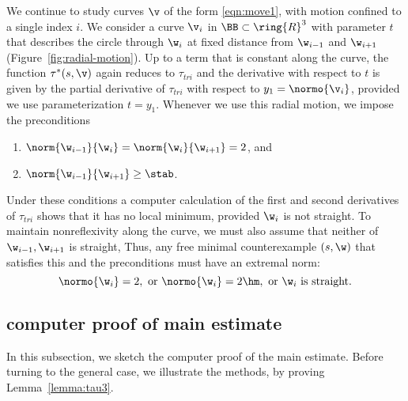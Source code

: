 %
\begin{remark}\label{rem:radial}
  We continue to study curves $\v$ of the form \eqref{eqn:move1}, with
  motion confined to a single index $i$.  We consider a curve $\v_i$
  in $\BB\subset\ring{R}^3$ with parameter $t$ that describes the
  circle through $\w_i$ at fixed distance from $\w_{i-1}$ and
  $\w_{i+1}$ (Figure~\ref{fig:radial-motion}).  Up to a term that is
  constant along the curve, the function $\tau^*(s,\v)$ again reduces
  to $\tau_{tri}$ and the derivative with respect to $t$ is given by
  the partial derivative of $\tau_{tri}$ with respect to
  $y_1=\normo{\v_i}$, provided we use parameterization $t=y_1$.
  Whenever we use this radial motion, we impose the preconditions
\begin{enumerate}
\item $\norm{\w_{i-1}}{\w_i}=\norm{\w_i}{\w_{i+1}}=2$, and
\item $\norm{\w_{i-1}}{\w_{i+1}} \ge \stab$.
\end{enumerate}
Under these conditions a computer calculation of the first and second
derivatives of $\tau_{tri}$ shows that it has no local minimum, provided
$\w_i$ is not straight.
To maintain nonreflexivity along the curve, we must also assume that
 neither of $\w_{i-1},\w_{i+1}$ is straight,
Thus,  any free minimal counterexample $(s,\w)$ that satisfies this and
the preconditions
must have an extremal norm:
\begin{equation}\label{eqn:extremal}
\normo{\w_i}=2,\text{ or } \normo{\w_i}=2\hm, \text{ or } \w_i
\text{ is straight.}
\end{equation}
\end{remark}

\figMVFCDJQ %


\subsection{computer proof of main estimate}

In this subsection, we sketch the computer proof of the main estimate.
Before turning to the general case, we illustrate the methods, by
proving Lemma~\ref{lemma:tau3}.

